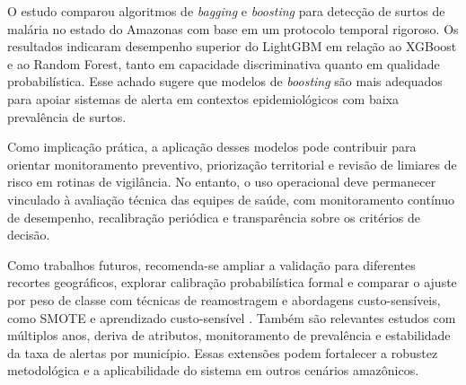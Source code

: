 
O estudo comparou algoritmos de \textit{bagging} e \textit{boosting} para detec\c{c}\~ao de surtos de mal\'aria no estado do Amazonas com base em um protocolo temporal rigoroso. Os resultados indicaram desempenho superior do LightGBM em rela\c{c}\~ao ao XGBoost e ao Random Forest, tanto em capacidade discriminativa quanto em qualidade probabil\'istica. Esse achado sugere que modelos de \textit{boosting} s\~ao mais adequados para apoiar sistemas de alerta em contextos epidemiol\'ogicos com baixa preval\^encia de surtos.

Como implica\c{c}\~ao pr\'atica, a aplica\c{c}\~ao desses modelos pode contribuir para orientar monitoramento preventivo, prioriza\c{c}\~ao territorial e revis\~ao de limiares de risco em rotinas de vigil\^ancia. No entanto, o uso operacional deve permanecer vinculado \`a avalia\c{c}\~ao t\'ecnica das equipes de sa\'ude, com monitoramento cont\'inuo de desempenho, recalibra\c{c}\~ao peri\'odica e transpar\^encia sobre os crit\'erios de decis\~ao.

Como trabalhos futuros, recomenda-se ampliar a valida\c{c}\~ao para diferentes recortes geogr\'aficos, explorar calibra\c{c}\~ao probabil\'istica formal e comparar o ajuste por peso de classe com t\'ecnicas de reamostragem e abordagens custo-sens\'iveis, como SMOTE e aprendizado custo-sens\'ivel \cite{chawla2002smote,elkan2001foundations}. Tamb\'em s\~ao relevantes estudos com m\'ultiplos anos, deriva de atributos, monitoramento de preval\^encia e estabilidade da taxa de alertas por munic\'ipio. Essas extens\~oes podem fortalecer a robustez metodol\'ogica e a aplicabilidade do sistema em outros cen\'arios amaz\^onicos.
